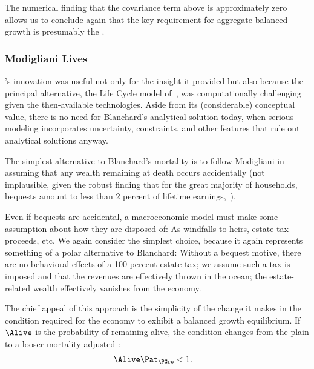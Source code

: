 \documentclass[BufferStockTheory]{subfiles}
\begin{document}
The numerical finding that the covariance term above is approximately zero allows us to conclude again that the key requirement for aggregate balanced growth is presumably the {\GICRaw}.

\hypertarget{Modigliani-Lives}{}
\subsubsection{Modigliani Lives}

\cite{blanchardFinite}'s innovation was useful not only for the insight it provided but also because the principal alternative, the Life Cycle model of~\cite{modiglianiWealth}, was computationally challenging given the then-available technologies. Aside from its (considerable) conceptual value, there is no need for Blanchard's analytical solution today, when serious modeling incorporates uncertainty, constraints, and other features that rule out analytical solutions anyway.%

The simplest alternative to Blanchard's mortality is to follow Modigliani in assuming that any wealth remaining at death occurs accidentally (not implausible, given the robust finding that for the great majority of households, bequests amount to less than 2 percent of lifetime earnings,~\cite{hendricksBequests,hendricksSmallBequests}).

Even if bequests are accidental, a macroeconomic model must make some assumption about how they are disposed of: As windfalls to heirs, estate tax proceeds, etc. We again consider the simplest choice, because it again represents something of a polar alternative to Blanchard: Without a bequest motive, there are no behavioral effects of a 100 percent estate tax; we assume such a tax is imposed and that the revenues are effectively thrown in the ocean; the estate-related wealth effectively vanishes from the economy.

The chief appeal of this approach is the simplicity of the change it makes in the condition required for the economy to exhibit a balanced growth equilibrium.  If $\Alive$ is the probability of remaining alive, the condition changes from the plain {\GIC} to a looser mortality-adjusted {\GIC}:
\hypertarget{GICMrt}{}
\begin{align}
  \Alive  \Pat_{\PGro} & < 1. \label{eq:GICMrt}
\end{align}
\end{document}
